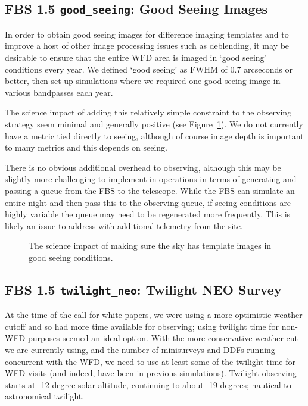 
\subsection{FBS 1.5 {\tt good\_seeing}: Good Seeing Images}\label{ss:goodseeing}

In order to obtain good seeing images for difference imaging templates and to improve a host of other image processing issues such as deblending, it may be desirable to ensure that the entire WFD area is imaged in `good seeing' conditions every year. We defined `good seeing' as FWHM of 0.7 arcseconds or better, then set up simulations where we required one good seeing image in various bandpasses each year.

The science impact of adding this relatively simple constraint to the observing strategy seem minimal and generally positive (see Figure~\ref{fig:goodseeing_radar}). We do not currently have a metric tied directly to seeing, although of course image depth is important to many metrics and this depends on seeing. 

There is no obvious additional overhead to observing, although this may be slightly more challenging to implement in operations in terms of generating and passing a queue from the FBS to the telescope. While the FBS can simulate an entire night and then pass this to the observing queue, if seeing conditions are highly variable the queue may need to be regenerated more frequently. This is likely an issue to address with additional telemetry from the site.

\begin{figure}
\caption{The science impact of making sure the sky has template images in good seeing conditions.} \label{fig:goodseeing_radar}
\end{figure}


\subsection{FBS 1.5 {\tt twilight\_neo}: Twilight NEO Survey}\label{ss:twilightneo}

At the time of the call for white papers, we were using a more optimistic weather cutoff and so had more time available for observing; using twilight time for non-WFD purposes seemed an ideal option. With the more conservative weather cut we are currently using, and the number of minisurveys and DDFs running concurrent with the WFD, we need to use at least some of the twilight time for WFD visits (and indeed, have been in previous simulations). Twilight observing starts at -12 degree solar altitude, continuing to about -19 degrees; nautical to astronomical twilight. 

